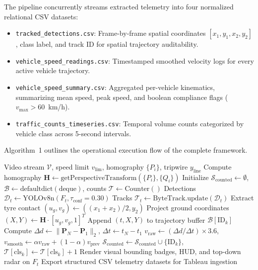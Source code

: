 \documentclass[conference]{IEEEtran}
\begin{document}
The pipeline concurrently streams extracted telemetry into four normalized relational CSV datasets:
\begin{itemize}
    \item[\textit{i)}] \texttt{tracked\_detections.csv}: Frame-by-frame spatial coordinates $[x_1, y_1, x_2, y_2]$, class label, and track ID for spatial trajectory auditability.
    \item[\textit{ii)}] \texttt{vehicle\_speed\_readings.csv}: Timestamped smoothed velocity logs for every active vehicle trajectory.
    \item[\textit{iii)}] \texttt{vehicle\_speed\_summary.csv}: Aggregated per-vehicle kinematics, summarizing mean speed, peak speed, and boolean compliance flags ($v_{\text{max}} > 60$~km/h).
    \item[\textit{iv)}] \texttt{traffic\_counts\_timeseries.csv}: Temporal volume counts categorized by vehicle class across 5-second intervals.
\end{itemize}

Algorithm~1 outlines the operational execution flow of the complete framework.

\begin{algorithm}[htbp]
\footnotesize
\caption{End-to-End Traffic Surveillance Pipeline}
\label{alg:pipeline}
\begin{algorithmic}[1]
\REQUIRE Video stream $\mathcal{V}$, speed limit $v_{\text{lim}}$, homography $\{P_i\}$, tripwire $y_{\text{line}}$
\STATE Compute homography $\mathbf{H} \leftarrow \text{getPerspectiveTransform}(\{P_i\}, \{Q_i\})$
\STATE Initialize $\mathcal{S}_{\text{counted}} \leftarrow \emptyset$, $\mathcal{B} \leftarrow \text{defaultdict}(\text{deque})$, counts $\mathcal{T} \leftarrow \text{Counter}()$
    \STATE Detections $\mathcal{D}_t \leftarrow \text{YOLOv8n}(F_t, \tau_{\text{conf}}=0.30)$
    \STATE Tracks $\mathcal{T}_t \leftarrow \text{ByteTrack.update}(\mathcal{D}_t)$
        \STATE Extract tyre contact $(u_g, v_g) \leftarrow ((x_1+x_2)/2, y_2)$
        \STATE Project ground coordinates $(X, Y) \leftarrow \mathbf{H} \cdot [u_g, v_g, 1]^T$
        \STATE Append $(t, X, Y)$ to trajectory buffer $\mathcal{B}[\text{ID}_k]$
            \STATE Compute $\Delta d \leftarrow \|\mathbf{P}_N - \mathbf{P}_1\|_2$, $\Delta t \leftarrow t_N - t_1$
            \STATE $v_{\text{raw}} \leftarrow (\Delta d / \Delta t) \times 3.6$, \ $v_{\text{smooth}} \leftarrow \alpha v_{\text{raw}} + (1-\alpha) v_{\text{prev}}$
        \ENDIF
            \STATE $\mathcal{S}_{\text{counted}} \leftarrow \mathcal{S}_{\text{counted}} \cup \{\text{ID}_k\}$, \ $\mathcal{T}[\text{cls}_k] \leftarrow \mathcal{T}[\text{cls}_k] + 1$
        \ENDIF
    \ENDFOR
    \STATE Render visual bounding badges, HUD, and top-down radar on $F_t$
\ENDFOR
\STATE Export structured CSV telemetry datasets for Tableau ingestion
\end{algorithmic}
\end{algorithm}
\end{document}
